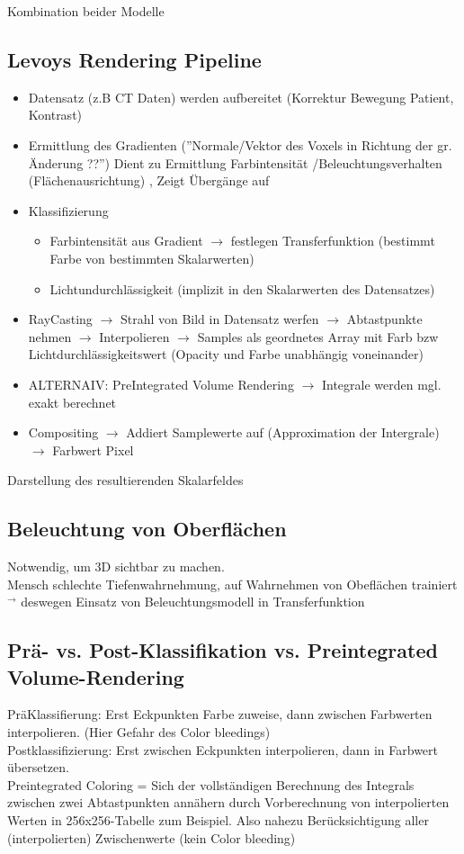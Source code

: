\documentclass{article}
\begin{document}
\noindent Kombination beider Modelle\\

\subsection{Levoys Rendering Pipeline}
\begin{itemize}
	\item Datensatz (z.B CT Daten) werden aufbereitet (Korrektur Bewegung Patient, Kontrast)
	\item Ermittlung des Gradienten (''Normale/Vektor des Voxels in Richtung der gr. Änderung ??'') Dient zu Ermittlung Farbintensität /Beleuchtungsverhalten (Flächenausrichtung) , Zeigt Übergänge auf
	\item Klassifizierung
	\begin{itemize}
		\item Farbintensität aus Gradient $\rightarrow$ festlegen Transferfunktion (bestimmt Farbe von bestimmten Skalarwerten) 
		\item Lichtundurchlässigkeit (implizit in den Skalarwerten des Datensatzes)
	\end{itemize}
	\item RayCasting $\rightarrow$ Strahl von Bild in Datensatz werfen $\rightarrow$ Abtastpunkte nehmen $\rightarrow$ Interpolieren $\rightarrow$ Samples als geordnetes Array mit Farb bzw Lichtdurchlässigkeitswert (Opacity und Farbe unabhängig voneinander)
	\item ALTERNAIV: PreIntegrated Volume Rendering $\rightarrow$ Integrale werden mgl. exakt berechnet
	\item Compositing $\rightarrow$ Addiert Samplewerte auf (Approximation der Intergrale) $\rightarrow$ Farbwert Pixel 
\end{itemize}

\noindent Darstellung des resultierenden Skalarfeldes

\subsection{Beleuchtung von Oberflächen}
Notwendig, um 3D sichtbar zu machen.\\
Mensch schlechte Tiefenwahrnehmung, auf Wahrnehmen von Obeflächen trainiert $^\rightarrow$ deswegen 
Einsatz von Beleuchtungsmodell in Transferfunktion

\subsection{Prä- vs. Post-Klassifikation vs. Preintegrated Volume-Rendering}
PräKlassifierung: Erst Eckpunkten Farbe zuweise, dann zwischen Farbwerten interpolieren. (Hier Gefahr des Color bleedings)\\
Postklassifizierung: Erst zwischen Eckpunkten interpolieren, dann in Farbwert übersetzen.\\
Preintegrated Coloring = Sich der vollständigen Berechnung des Integrals zwischen zwei Abtastpunkten annähern durch Vorberechnung von interpolierten Werten in 256x256-Tabelle zum Beispiel. Also nahezu Berücksichtigung aller (interpolierten) Zwischenwerte  (kein Color bleeding) \\
\end{document}
